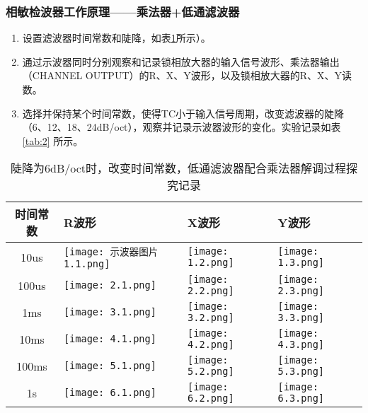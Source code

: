 \documentclass[dvipsnames, svgnames,a4paper,11pt]{article}
\begin{document}
	\subsubsection{相敏检波器工作原理——乘法器+低通滤波器}
		\begin{enumerate}
			\item 设置滤波器时间常数和陡降，如表\ref{tab:1}所示）。
			\item 通过示波器同时分别观察和记录锁相放大器的输入信号波形、乘法器输出（CHANNEL OUTPUT）的R、X、Y波形，以及锁相放大器的R、X、Y读数。
			\item 选择并保持某个时间常数，使得TC小于输入信号周期，改变滤波器的陡降（6、12、18、24dB/oct），观察并记录示波器波形的变化。实验记录如表 \ref{tab:2}  所示。
		\end{enumerate}

		\begin{table}[ht]
			\centering
			\begin{tabularx}{\textwidth}{|c|X|X|X|}
				\hline
				时间常数 & R波形  & X波形  & Y波形 \\
				\hline
				10us & \texttt{[image: 示波器图片1.1.png]} & \texttt{[image: 1.2.png]}&\texttt{[image: 1.3.png]} \\
				\hline
				100us &\texttt{[image: 2.1.png]} & \texttt{[image: 2.2.png]} & \texttt{[image: 2.3.png]}\\
				
				\hline
				1ms &\texttt{[image: 3.1.png]} & \texttt{[image: 3.2.png]} & \texttt{[image: 3.3.png]} \\
				
				\hline
				10ms & \texttt{[image: 4.1.png]} & \texttt{[image: 4.2.png]} & \texttt{[image: 4.3.png]} \\
				
				\hline
				100ms & \texttt{[image: 5.1.png]} & \texttt{[image: 5.2.png]} & \texttt{[image: 5.3.png]} \\
				
				\hline
				1s & \texttt{[image: 6.1.png]} & \texttt{[image: 6.2.png]}  & \texttt{[image: 6.3.png]} \\
				
				\hline
		\end{tabularx}
		\caption{陡降为6dB/oct时，改变时间常数，低通滤波器配合乘法器解调过程探究记录}
		\label{tab:1}
		\end{table}
		
\end{document}
